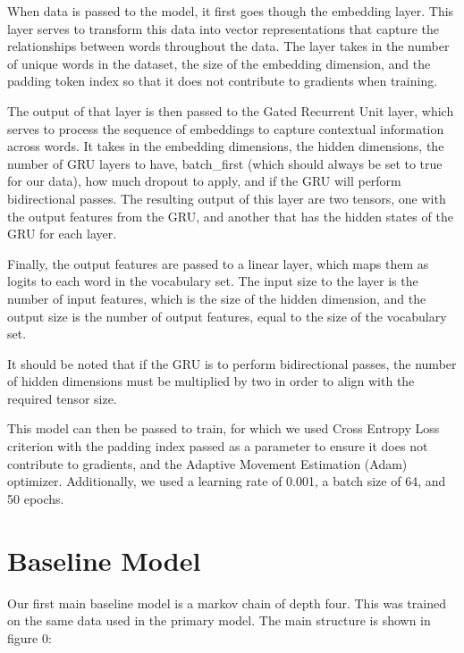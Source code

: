 \documentclass{article} %
\begin{document}
When data is passed to the model, it first goes though the embedding layer. This layer serves to transform this data into vector representations that capture the relationships between words throughout the data. 
The layer takes in the number of unique words in the dataset, the size of the embedding dimension, and the padding token index so that it does not contribute to gradients when training.

The output of that layer is then passed to the Gated Recurrent Unit layer, which serves to
process the sequence of embeddings to capture contextual information across words. It takes in the embedding dimensions, the hidden dimensions, 
the number of GRU layers to have, batch\_first (which should always be set to true for our data),
how much dropout to apply, and if the GRU will perform bidirectional passes. The resulting output of this layer are two tensors, 
one with the output features from the GRU, and another that has the hidden states of the GRU for each layer.

Finally, the output features are passed to a linear layer, which maps them as logits to each word in the vocabulary set. The input size to the layer is the number of input features, 
which is the size of the hidden dimension, and the output size is the number of output features, equal to the size of the vocabulary set.

It should be noted that if the GRU is to perform bidirectional passes, the number of hidden dimensions must be multiplied by two in order to align with the required tensor size.

This model can then be passed to train, for which we used Cross Entropy Loss criterion with the padding index passed as a parameter to ensure it does not contribute to gradients, 
and the Adaptive Movement Estimation (Adam) optimizer. Additionally, we used a learning rate of 0.001, a batch size of 64, and 50 epochs.

\section{Baseline Model}

Our first main baseline model is a markov chain of depth four. This was trained on the same data used in the primary model.
The main structure is shown in figure 0:
\end{document}
